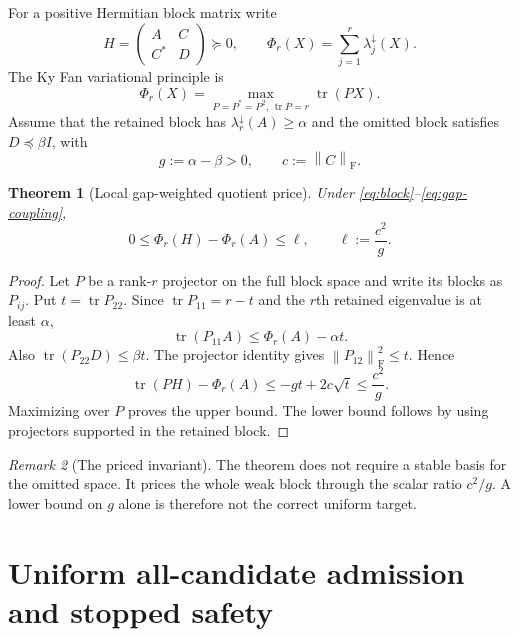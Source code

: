\documentclass[11pt]{article}
\newtheorem{theorem}{Theorem}[section]
\theoremstyle{definition}
\theoremstyle{remark}
\newtheorem{remark}[theorem]{Remark}
\newcommand{\norm}[1]{\left\lVert#1\right\rVert}
\newcommand{\F}{\mathrm F}
\newcommand{\tr}{\operatorname{tr}}
\begin{document}
For a positive Hermitian block matrix write
\begin{equation}
 H=\begin{pmatrix}A&C\\C^*&D\end{pmatrix}\succeq0,
 \qquad
 \Phi_r(X)=\sum_{j=1}^r\lambda_j^\downarrow(X).
 \label{eq:block}
\end{equation}
The Ky Fan variational principle is
\[
 \Phi_r(X)=\max_{P=P^*=P^2,\,\tr P=r}\tr(PX).
\]
Assume that the retained block has $\lambda_r^\downarrow(A)\ge\alpha$ and
the omitted block satisfies $D\preceq\beta I$, with
\begin{equation}
 g:=\alpha-\beta>0,
 \qquad c:=\norm C_{\F}.
 \label{eq:gap-coupling}
\end{equation}

\begin{theorem}[Local gap-weighted quotient price]
 \label{thm:local}
 Under \eqref{eq:block}--\eqref{eq:gap-coupling},
 \begin{equation}
 0\le\Phi_r(H)-\Phi_r(A)\le\ell,
 \qquad
 \ell:=\frac{c^2}{g}.
 \label{eq:local-price}
\end{equation}
\end{theorem}

\begin{proof}
 Let $P$ be a rank-$r$ projector on the full block space and write its blocks
 as $P_{ij}$.  Put $t=\tr P_{22}$.  Since
 $\tr P_{11}=r-t$ and the $r$th retained eigenvalue is at least $\alpha$,
 \[
 \tr(P_{11}A)\le\Phi_r(A)-\alpha t.
 \]
 Also $\tr(P_{22}D)\le\beta t$.  The projector identity gives
 $\norm{P_{12}}_{\F}^2\le t$.  Hence
 \[
 \tr(PH)-\Phi_r(A)
 \le-gt+2c\sqrt t
 \le\frac{c^2}{g}.
 \]
 Maximizing over $P$ proves the upper bound.  The lower bound follows by
 using projectors supported in the retained block.
\end{proof}

\begin{remark}[The priced invariant]
 The theorem does not require a stable basis for the omitted space.  It prices
 the whole weak block through the scalar ratio $c^2/g$.  A lower bound on $g$
 alone is therefore not the correct uniform target.
\end{remark}

\section{Uniform all-candidate admission and stopped safety}
\label{sec:global}
\end{document}
